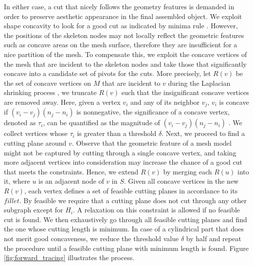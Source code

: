 In either case, a cut that nicely follows the geometry features is demanded in order to preserve aesthetic appearance in the final assembled object. We exploit shape concavity to look for a good cut as indicated by minima rule \cite{hoffman1984parts,hoffman1997salience}. However, the positions of the skeleton nodes may not locally reflect the geometric features such as concave areas on the mesh surface, therefore they are insufficient for a nice partition of the mesh. To compensate this, we exploit the concave vertices of the mesh that are incident to the skeleton nodes and take those that significantly concave into a candidate set of pivots for the cuts. More precisely, let $R(v)$ be the set of concave vertices on $M$ that are incident to $v$ during the Laplacian shrinking process \cite{AuTCCL08}, we truncate $R(v)$ such that the insignificant concave vertices are removed away. Here, given a vertex $v_i$ and any of its neighbor $v_j$, $v_i$ is concave if $(v_i - v_j)(n_j - n_i)$ is nonnegative, the significance of a concave vertex, denoted as $\tau_i$, can be quantified as the magnitude of $(v_i - v_j)(n_j - n_i)$ \cite{au2012mesh}. We collect vertices whose $\tau_i$ is greater than a threshold $\delta$.
Next, we proceed to find a cutting plane around $v$. Observe that the geometric feature of a mesh model might not be captured by cutting through a single concave vertex, and taking more adjacent vertices into consideration may increase the chance of a good cut that meets the constraints. Hence, we extend $R(v)$ by merging each $R(u)$ into it, where $u$ is an adjacent node of $v$ in $S$. Given all concave vertices in the new $R(v)$, each vertex defines a set of feasible cutting planes in accordance to its $fillet$. By feasible we require that a cutting plane does not cut through any other subgraph except for $H_i$. A relaxation on this constraint is allowed if no feasible cut is found. We then exhaustively go through all feasible cutting planes and find the one whose cutting length is minimum. In case of a cylindrical part that does not merit good concaveness, we reduce the threshold value $\delta$ by half and repeat the procedure until a feasible cutting plane with minimum length is found. Figure \ref{fig:forward_tracing} illustrates the process.

